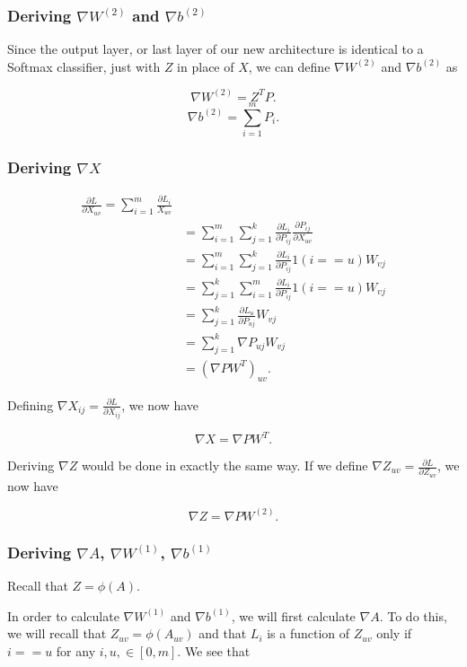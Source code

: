 \subsubsection{Deriving $\nabla W^{(2)}$ and $\nabla b^{(2)}$}
Since the output layer, or last layer of our new architecture is identical to a
Softmax classifier, just with $Z$ in place of $X$, we can define $\nabla
W^{(2)}$ and $\nabla b^{(2)}$ as

$$ \nabla W^{(2)}  = Z^T P. $$
$$ \nabla b^{(2)}  = \sum_{i=1}^m P_i. $$

\subsubsection{Deriving $\nabla X$}
\begin{align*}
  \frac{\partial L}{\partial X_{uv}}
  =\sum_{i=1}^m \frac{\partial L_i}{X_{uv}}\\
  &= \sum_{i=1}^m \sum_{j=1}^k \frac{\partial L_i}{\partial P_{ij}}
      \frac{\partial P_{ij}}{\partial X_{uv}}\\
  &= \sum_{i=1}^m \sum_{j=1}^k \frac{\partial L_i}{\partial P_{ij}}
      1(i == u) W_{vj}\\
  &= \sum_{j=1}^k \sum_{i=1}^m \frac{\partial L_i}{\partial P_{ij}}
      1(i == u) W_{vj}\\
  &= \sum_{j=1}^k \frac{\partial L_u}{\partial P_{uj}} W_{vj}\\
  &= \sum_{j=1}^k \nabla P_{uj} W_{vj}\\
  &= \left( \nabla P W^T \right) _{uv}.
\end{align*}

Defining $\nabla X_{ij} = \frac{\partial L}{\partial X_{ij}}$, we now have

$$ \nabla X = \nabla P W^T. $$

Deriving $\nabla Z$ would be done in exactly the same way. If we define
$\nabla Z_{uv} = \frac{\partial L}{\partial Z_{uv}}$, we now have

$$ \nabla Z = \nabla P W^{(2)}. $$

\subsubsection{Deriving $\nabla A$, $\nabla W^{(1)}$, $\nabla b^{(1)}$}
Recall that $Z = \phi(A).$

In order to calculate $\nabla W^{(1)}$ and $\nabla b^{(1)}$, we will first
calculate $\nabla A$. To do this, we will recall that $Z_{uv} = \phi(A_{uv})$
and that $L_i$ is a function of $Z_{uv}$ only if $i == u$ for any $i, u, \in
[0, m]$. We see that

